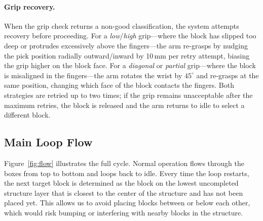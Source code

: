 \paragraph{Grip recovery.} When the grip check returns a non-good classification, the system attempts recovery before proceeding. For a \emph{low}/\emph{high} grip---where the block has slipped too deep or protrudes excessively above the fingers---the arm re-grasps by nudging the pick position radially outward/inward by 10\,mm per retry attempt, biasing the grip higher on the block face. For a \emph{diagonal} or \emph{partial} grip---where the block is misaligned in the fingers---the arm rotates the wrist by $45^\circ$ and re-grasps at the same position, changing which face of the block contacts the fingers. Both strategies are retried up to two times; if the grip remains unacceptable after the maximum retries, the block is released and the arm returns to idle to select a different block.

\subsection{Main Loop Flow}

Figure~\ref{fig:flow} illustrates the full cycle. Normal operation flows
through the boxes from top to bottom and loops back to idle. Every time the loop restarts, the next target block is determined as the block on the lowest uncompleted structure layer that is closest to the center of the structure and has not been placed yet. This allows us to avoid placing blocks between or below each other, which would risk bumping or interfering with nearby blocks in the structure.

